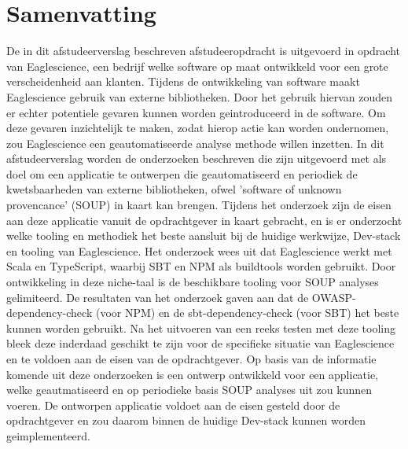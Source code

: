 


\chapter{Samenvatting}\label{ch:samenvatting}

De in dit afstudeerverslag beschreven afstudeeropdracht is uitgevoerd in opdracht van Eaglescience, een bedrijf welke software op maat ontwikkeld voor een grote verscheidenheid aan klanten. Tijdens de ontwikkeling van software maakt Eaglescience gebruik van externe bibliotheken. Door het gebruik hiervan zouden er echter potentiele gevaren kunnen worden geintroduceerd in de software. Om deze gevaren inzichtelijk te maken, zodat hierop actie kan worden ondernomen, zou Eaglescience een geautomatiseerde analyse methode willen inzetten. In dit afstudeerverslag worden de onderzoeken beschreven die zijn uitgevoerd met als doel om een applicatie te ontwerpen die geautomatiseerd en periodiek de kwetsbaarheden van externe bibliotheken, ofwel 'software of unknown provencance' (SOUP) in kaart kan brengen.
Tijdens het onderzoek zijn de eisen aan deze applicatie vanuit de opdrachtgever in kaart gebracht, en is er onderzocht welke tooling en methodiek het beste aansluit bij de huidige werkwijze, Dev-stack en tooling van Eaglescience. Het onderzoek wees uit dat Eaglescience werkt met Scala en TypeScript, waarbij SBT en NPM als buildtools worden gebruikt. Door ontwikkeling in deze niche-taal is de beschikbare tooling voor SOUP analyses gelimiteerd. De resultaten van het onderzoek gaven aan dat de OWASP-dependency-check (voor NPM) en de sbt-dependency-check (voor SBT) het beste kunnen worden gebruikt. Na het uitvoeren van een reeks testen met deze tooling bleek deze inderdaad geschikt te zijn voor de specifieke situatie van Eaglescience en te voldoen aan de eisen van de opdrachtgever. Op basis van de informatie komende uit deze onderzoeken is een ontwerp ontwikkeld voor een applicatie, welke geautmatiseerd en op periodieke basis SOUP analyses uit zou kunnen voeren. De ontworpen applicatie voldoet aan de eisen gesteld door de opdrachtgever en zou daarom binnen de huidige Dev-stack kunnen worden geimplementeerd.





\vfill
